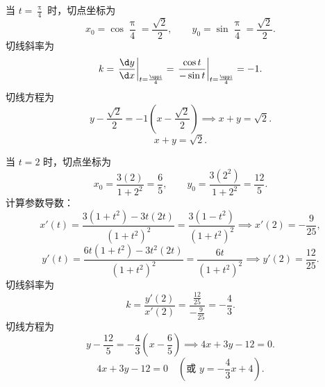 \begin{solution}

    当 $t = \frac{\uppi}{4}$ 时，切点坐标为
    \begin{equation}
        x_0 = \cos\frac{\uppi}{4} = \frac{\sqrt{2}}{2}, \qquad y_0 = \sin\frac{\uppi}{4} = \frac{\sqrt{2}}{2}.
    \end{equation}
    切线斜率为
    \begin{equation}
        k = \left. \frac{\d y}{\d x} \right|_{t=\frac{\uppi}{4}} = \left. \frac{\cos t}{-\sin t} \right|_{t=\frac{\uppi}{4}} = -1.
    \end{equation}
    切线方程为
    \begin{equation}
        y - \frac{\sqrt{2}}{2} = -1\left( x - \frac{\sqrt{2}}{2} \right) \implies x + y = \sqrt{2}.
    \end{equation}
    \begin{equation}
        \boxed{x + y = \sqrt{2}.}
    \end{equation}


    当 $t = 2$ 时，切点坐标为
    \begin{equation}
        x_0 = \frac{3(2)}{1+2^2} = \frac{6}{5}, \qquad y_0 = \frac{3(2^2)}{1+2^2} = \frac{12}{5}.
    \end{equation}
    计算参数导数：
    \begin{equation}
        x'(t) = \frac{3(1+t^2) - 3t(2t)}{(1+t^2)^2} = \frac{3(1-t^2)}{(1+t^2)^2} \implies x'(2) = -\frac{9}{25},
    \end{equation}
    \begin{equation}
        y'(t) = \frac{6t(1+t^2) - 3t^2(2t)}{(1+t^2)^2} = \frac{6t}{(1+t^2)^2} \implies y'(2) = \frac{12}{25}.
    \end{equation}
    切线斜率为
    \begin{equation}
        k = \frac{y'(2)}{x'(2)} = \frac{\frac{12}{25}}{-\frac{9}{25}} = -\frac{4}{3}.
    \end{equation}
    切线方程为
    \begin{equation}
        y - \frac{12}{5} = -\frac{4}{3}\left( x - \frac{6}{5} \right) \implies 4x + 3y - 12 = 0.
    \end{equation}
    \begin{equation}
        \boxed{4x + 3y - 12 = 0 \quad \left(\text{或 } y = -\frac{4}{3}x + 4\right).}
    \end{equation}
\end{solution}

\endinput

